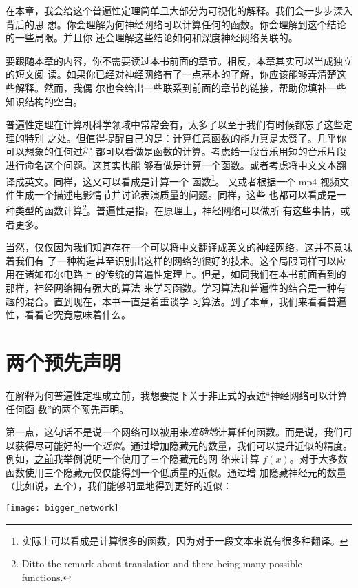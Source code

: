 在本章，我会给这个普遍性定理简单且大部分为可视化的解释。我们会一步步深入背后的思
想。你会理解为何神经网络可以计算任何的函数。你会理解到这个结论的一些局限。并且你
还会理解这些结论如何和深度神经网络关联的。

要跟随本章的内容，你不需要读过本书前面的章节。相反，本章其实可以当成独立的短文阅
读。如果你已经对神经网络有了一点基本的了解，你应该能够弄清楚这些解释。然而，我偶
尔也会给出一些联系到前面的章节的链接，帮助你填补一些知识结构的空白。

普遍性定理在计算机科学领域中常常会有，太多了以至于我们有时候都忘了这些定理的特别
之处。但值得提醒自己的是：计算任意函数的能力真是太赞了。几乎你可以想象的任何过程
都可以看做是函数的计算。考虑给一段音乐用短的音乐片段进行命名这个问题。这其实也能
够看做是计算一个函数。或者考虑将中文文本翻译成英文。同样，这又可以看成是计算一个
函数\footnote{实际上可以看成是计算很多的函数，因为对于一段文本来说有很多种翻译。}。
又或者根据一个 mp4 视频文件生成一个描述电影情节并讨论表演质量的问题。同样，这些
也都可以看成是一种类型的函数计算\footnote{Ditto the remark about translation and
  there being many possible functions.}。普遍性是指，在原理上，神经网络可以做所
有这些事情，或者更多。

当然，仅仅因为我们知道存在一个可以将中文翻译成英文的神经网络，这并不意味着我们有
了一种构造甚至识别出这样的网络的很好的技术。这个局限同样可以应用在诸如布尔电路上
的传统的普遍性定理上。但是，如同我们在本书前面看到的那样，神经网络拥有强大的算法
来学习函数。学习算法和普遍性的结合是一种有趣的混合。直到现在，本书一直是着重谈学
习算法。到了本章，我们来看看普遍性，看看它究竟意味着什么。

\section{两个预先声明}
\label{sec:two_caveats}

在解释为何普遍性定理成立前，我想要提下关于非正式的表述``神经网络可以计算任何函
数''的两个预先声明。

第一点，这句话不是说一个网络可以被用来\emph{准确地}计算任何函数。而是说，我们可
以获得尽可能好的一个\emph{近似}。通过增加隐藏元的数量，我们可以提升近似的精度。
例如，\hyperref[basic_network_precursor]{之前}我举例说明一个使用了三个隐藏元的网
络来计算 $f(x)$。对于大多数函数使用三个隐藏元仅仅能得到一个低质量的近似。通过增
加隐藏神经元的数量（比如说，五个），我们能够明显地得到更好的近似：
\begin{center}
  \texttt{[image: bigger\_network]}
\end{center}

